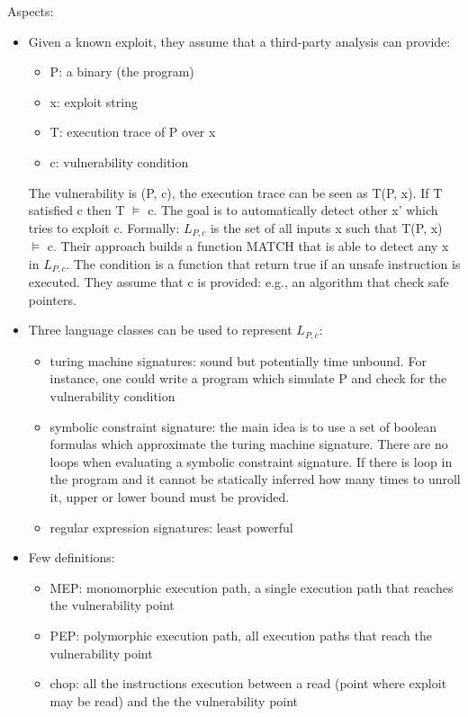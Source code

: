 \documentclass[10pt, a4paper]{article}
\begin{document}
Aspects:
\begin{itemize}
  \item Given a known exploit, they assume that a third-party analysis can provide:
    \begin{itemize}
      \item P: a binary (the program)
      \item x: exploit string
      \item T: execution trace of P over x
      \item c: vulnerability condition
    \end{itemize}
    The vulnerability is (P, c), the execution trace can be seen as T(P, x). If T satisfied c then T $\models$ c.
    The goal is to automatically detect other x' which tries to exploit c. Formally: $L_{P, c}$ is the set of all inputs x such that T(P, x) $\models$ c. Their approach builds a function MATCH that is able to detect any x in $L_{P, c}$. The condition is a function that return true if an unsafe instruction is executed. They assume that c is provided: e.g., an algorithm that check safe pointers.
  \item Three language classes can be used to represent $L_{P,c}$:
    \begin{itemize}
      \item turing machine signatures: sound but potentially time unbound. For instance, one could write a program which simulate P and check for the vulnerability condition
      \item symbolic constraint signature: the main idea is to use a set of boolean formulas which approximate the turing machine signature. There are no loops when evaluating a symbolic constraint signature. If there is loop in the program and it cannot be statically inferred how many times to unroll it, upper or lower bound must be provided.
      \item regular expression signatures: least powerful 
    \end{itemize}
  \item Few definitions:
    \begin{itemize}
      \item MEP: monomorphic execution path, a single execution path that reaches the vulnerability point
      \item PEP: polymorphic execution path, all execution paths that reach the vulnerability point
      \item chop: all the instructions execution between a read (point where exploit may be read) and the the vulnerability point

\end{itemize}
\end{itemize}
\end{document}
